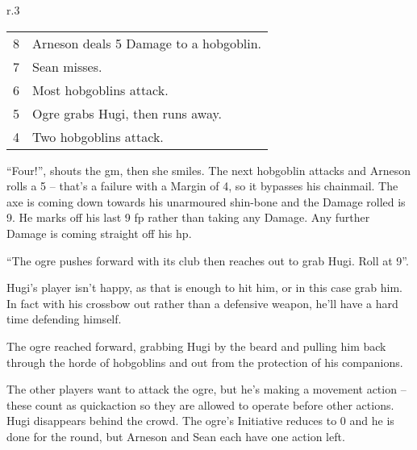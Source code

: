 \begin{exampletext}
\begin{wrapfigure}{r}{.3\textwidth}
\begin{tabularx}{.3\textwidth}{c|X}
		8 & Arneson deals 5 Damage to a hobgoblin. \\

		7 & Sean misses. \\

		6 & Most hobgoblins attack. \\

		5 & Ogre grabs Hugi, then runs away. \\
		4 & Two hobgoblins attack. \\

	\end{tabularx}

\end{wrapfigure}

``Four!'', shouts the \gls{gm}, then she smiles. The next hobgoblin attacks and Arneson rolls a 5 -- that's a failure with a Margin of 4, so it bypasses his chainmail. The axe is coming down towards his unarmoured shin-bone and the Damage rolled is 9. He marks off his last 9 \gls{fp} rather than taking any Damage. Any further Damage is coming straight off his \gls{hp}.

``The ogre pushes forward with its club then reaches out to grab Hugi. Roll at  9''.

Hugi's player isn't happy, as that is enough to hit him, or in this case grab him. In fact with his crossbow out rather than a defensive weapon, he'll have a hard time defending himself.

The ogre reached forward, grabbing Hugi by the beard and pulling him back through the horde of hobgoblins and out from the protection of his companions.

The other players want to attack the ogre, but he's making a movement action -- these count as \gls{quickaction} so they are allowed to operate before other actions.
Hugi disappears behind the crowd.
The ogre's Initiative reduces to 0 and he is done for the \gls{round}, but Arneson and Sean each have one action left.

\end{exampletext}

